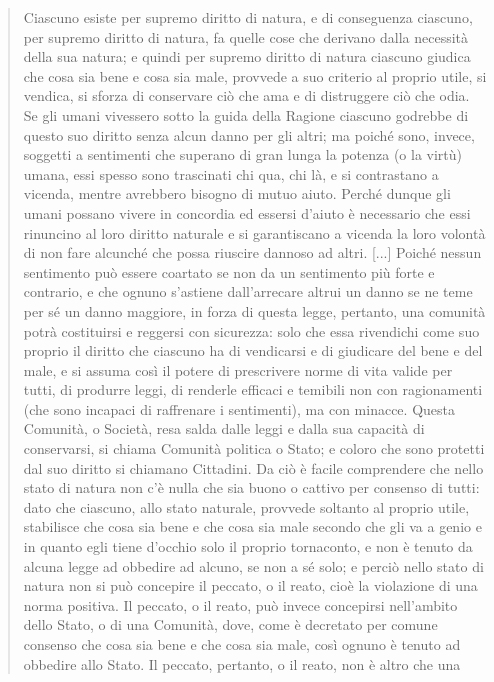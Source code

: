 \begin{quotation}
	\small Ciascuno esiste per supremo diritto di natura, e di conseguenza ciascuno, per supremo
	diritto di natura, fa quelle cose che derivano dalla necessità della sua natura; e quindi per
	supremo diritto di natura ciascuno giudica che cosa sia bene e cosa sia male, provvede a
	suo criterio al proprio utile, si vendica, si sforza di conservare ciò che ama e di distruggere
	ciò che odia. Se gli umani vivessero sotto la guida della Ragione ciascuno godrebbe di questo suo diritto senza alcun danno per gli altri; ma poiché sono, invece, soggetti a sentimenti
	che superano di gran lunga la potenza (o la virtù) umana, essi spesso sono trascinati chi
	qua, chi là, e si contrastano a vicenda, mentre avrebbero bisogno di mutuo aiuto. Perché
	dunque gli umani possano vivere in concordia ed essersi d’aiuto è necessario che essi rinuncino al loro diritto naturale e si garantiscano a vicenda la loro volontà di non fare alcunché che possa riuscire dannoso ad altri. [...] 
	Poiché nessun sentimento può essere coartato se non da un sentimento più forte e contrario, e
	che ognuno s’astiene dall’arrecare altrui un danno se ne teme per sé un danno maggiore, in
	forza di questa legge, pertanto, una comunità potrà costituirsi e reggersi con sicurezza: solo
	che essa rivendichi come suo proprio il diritto che ciascuno ha di vendicarsi e di giudicare
	del bene e del male, e si assuma così il potere di prescrivere norme di vita valide per tutti,
	di produrre leggi, di renderle efficaci e temibili non con ragionamenti (che sono incapaci di
	raffrenare i sentimenti), ma con minacce. Questa Comunità, o Società, resa salda dalle leggi e dalla sua capacità di conservarsi, si chiama Comunità politica o Stato; e coloro che sono protetti dal suo diritto si chiamano Cittadini. Da ciò è facile comprendere che nello stato di natura non c’è nulla che sia buono o cattivo per consenso di tutti: dato che ciascuno,
	allo stato naturale, provvede soltanto al proprio utile, stabilisce che cosa sia bene e che cosa sia male secondo che gli va a genio e in quanto egli tiene d’occhio solo il proprio tornaconto, e non è tenuto da alcuna legge ad obbedire ad alcuno, se non a sé solo; e perciò nello
	stato di natura non si può concepire il peccato, o il reato, cioè la violazione di una norma
	positiva.
	Il peccato, o il reato, può invece concepirsi nell’ambito dello Stato, o di una Comunità,
	dove, come è decretato per comune consenso che cosa sia bene e che cosa sia male, così
	ognuno è tenuto ad obbedire allo Stato. Il peccato, pertanto, o il reato, non è altro che una

\end{quotation}
